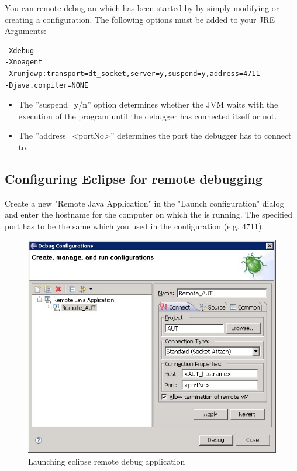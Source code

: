 You can remote debug an \gdaut{} which has been started by \app{}
by simply modifying or creating a \gdaut{} configuration. The following options must be added to your JRE Arguments:

\begin{verbatim}
-Xdebug 
-Xnoagent 
-Xrunjdwp:transport=dt_socket,server=y,suspend=y,address=4711 
-Djava.compiler=NONE 
\end{verbatim}

\begin{itemize}
 \item The ''suspend=y/n'' option determines whether the JVM waits with the execution of the program until the debugger has connected itself or not.
 \item The ''address=<portNo>'' determines the port the debugger has to connect to.
\end{itemize}


\subsection{Configuring Eclipse for remote debugging}
Create a new "Remote Java Application" in the "Launch configuration" dialog 
and enter the hostname for the computer on which the \gdagent{} is running. The specified port has to be the same which you used in the \gdaut{} configuration (e.g. 4711).

\begin{figure}[h]
\includegraphics[width=\textwidth]{Debugging/PS/eclipseRemoteDebug}
\caption{Launching eclipse remote debug application}
\label{EclipseRemoteDebugging}
\end{figure}

